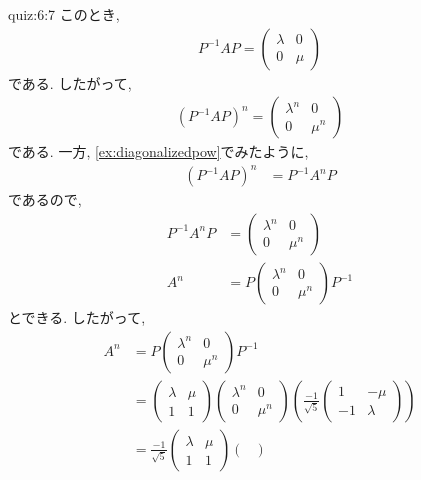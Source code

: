 \begin{answerof}{quiz:6:7}
このとき,
\begin{align*}
  P^{-1}AP=
  \begin{pmatrix}
    \lambda&0\\
    0&\mu
  \end{pmatrix}
\end{align*}
である.
したがって,
\begin{align*}
  (P^{-1}AP)^n=
  \begin{pmatrix}
    \lambda^n&0\\
    0&\mu^n
  \end{pmatrix}
\end{align*}
である.
一方, \cref{ex:diagonalizedpow}でみたように,
\begin{align*}
  (P^{-1}AP)^n
  &=P^{-1}A^nP
\end{align*}
であるので,
\begin{align*}
P^{-1}A^nP&=
  \begin{pmatrix}
    \lambda^n&0\\
    0&\mu^n
  \end{pmatrix}
\\
A^n&=
P
  \begin{pmatrix}
    \lambda^n&0\\
    0&\mu^n
  \end{pmatrix}
  P^{-1}
\end{align*}
とできる.
したがって,
\begin{align*}
  A^n
  &=
P
  \begin{pmatrix}
    \lambda^n&0\\
    0&\mu^n
  \end{pmatrix}
  P^{-1}\\
&=
  \begin{pmatrix}
    \lambda&\mu\\
    1&1    
  \end{pmatrix}
  \begin{pmatrix}
    \lambda^n&0\\
    0&\mu^n
  \end{pmatrix}
(  \frac{-1}{\sqrt{5}}
  \begin{pmatrix}
    1&-\mu\\
    -1&\lambda    
  \end{pmatrix}
)\\
&=\frac{-1}{\sqrt{5}}
  \begin{pmatrix}
    \lambda&\mu\\
    1&1    
  \end{pmatrix}
  \begin{pmatrix}

\end{pmatrix}
\end{align*}
\end{answerof}
